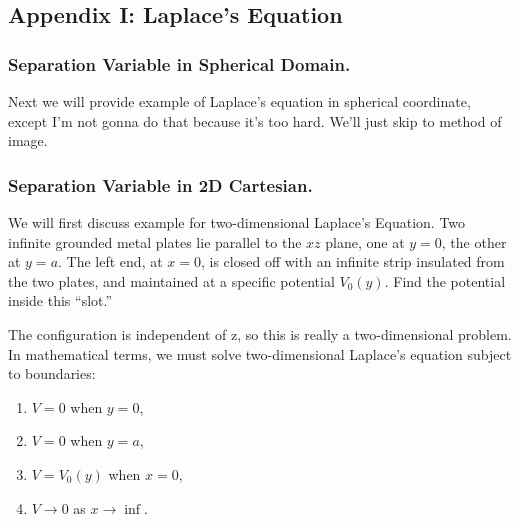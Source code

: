\documentclass[../../../main.tex]{subfiles}
\begin{document}
\subsection*{Appendix I: Laplace's Equation}

\subsubsection*{Separation Variable in Spherical Domain.} Next we will provide example of Laplace's equation in spherical coordinate, except I'm not gonna do that because it's too hard. We'll just skip to method of image.

\subsubsection*{Separation Variable in 2D Cartesian.} We will first discuss example for two-dimensional Laplace's Equation. Two infinite grounded metal plates lie parallel to the $x z$ plane, one at $y = 0$, the other at $y = a$. The left end, at $x = 0$, is closed off with an infinite strip insulated from the two plates, and maintained at a specific potential $V_0(y)$. Find the potential inside this “slot.”
\begin{figure*}[ht]
    \centering
\end{figure*}
The configuration is independent of z, so this is really a two-dimensional problem.
In mathematical terms, we must solve two-dimensional Laplace's equation subject to boundaries:
\begin{enumerate}
    \item $V = 0$ when $y = 0$,
    \item $V = 0$ when $y = a$,
    \item $V = V_0(y)$ when $x = 0$,
    \item $V \rightarrow 0$ as $x\rightarrow\inf $.
\end{enumerate}
\end{document}
